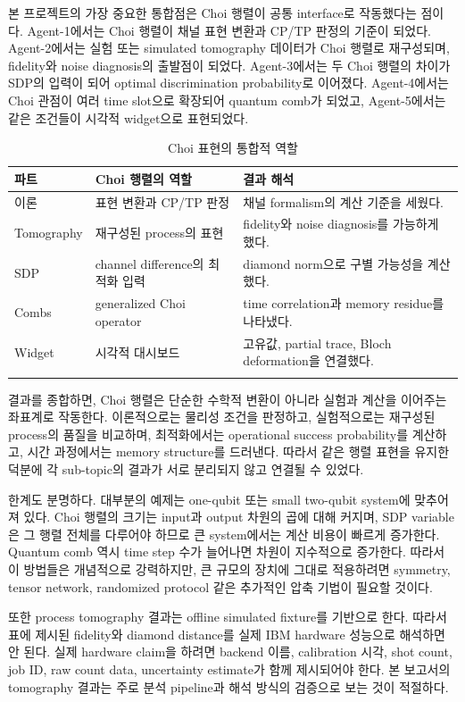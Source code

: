 \documentclass[11pt,a4paper]{article}
\begin{document}
본 프로젝트의 가장 중요한 통합점은 Choi 행렬이 공통 interface로 작동했다는 점이다. Agent-1에서는 Choi 행렬이 채널 표현 변환과 CP/TP 판정의 기준이 되었다. Agent-2에서는 실험 또는 simulated tomography 데이터가 Choi 행렬로 재구성되며, fidelity와 noise diagnosis의 출발점이 되었다. Agent-3에서는 두 Choi 행렬의 차이가 SDP의 입력이 되어 optimal discrimination probability로 이어졌다. Agent-4에서는 Choi 관점이 여러 time slot으로 확장되어 quantum comb가 되었고, Agent-5에서는 같은 조건들이 시각적 widget으로 표현되었다.

\begin{longtable}{p{}p{}p{}}
\toprule
파트 & Choi 행렬의 역할 & 결과 해석 \\
\midrule
이론 & 표현 변환과 CP/TP 판정 & 채널 formalism의 계산 기준을 세웠다. \\
Tomography & 재구성된 process의 표현 & fidelity와 noise diagnosis를 가능하게 했다. \\
SDP & channel difference의 최적화 입력 & diamond norm으로 구별 가능성을 계산했다. \\
Combs & generalized Choi operator & time correlation과 memory residue를 나타냈다. \\
Widget & 시각적 대시보드 & 고유값, partial trace, Bloch deformation을 연결했다. \\
\bottomrule
\caption{Choi 표현의 통합적 역할}
\label{tab:integration}
\end{longtable}

결과를 종합하면, Choi 행렬은 단순한 수학적 변환이 아니라 실험과 계산을 이어주는 좌표계로 작동한다. 이론적으로는 물리성 조건을 판정하고, 실험적으로는 재구성된 process의 품질을 비교하며, 최적화에서는 operational success probability를 계산하고, 시간 과정에서는 memory structure를 드러낸다. 따라서 같은 행렬 표현을 유지한 덕분에 각 sub-topic의 결과가 서로 분리되지 않고 연결될 수 있었다.

한계도 분명하다. 대부분의 예제는 one-qubit 또는 small two-qubit system에 맞추어져 있다. Choi 행렬의 크기는 input과 output 차원의 곱에 대해 커지며, SDP variable은 그 행렬 전체를 다루어야 하므로 큰 system에서는 계산 비용이 빠르게 증가한다. Quantum comb 역시 time step 수가 늘어나면 차원이 지수적으로 증가한다. 따라서 이 방법들은 개념적으로 강력하지만, 큰 규모의 장치에 그대로 적용하려면 symmetry, tensor network, randomized protocol 같은 추가적인 압축 기법이 필요할 것이다.

또한 process tomography 결과는 offline simulated fixture를 기반으로 한다. 따라서 표에 제시된 fidelity와 diamond distance를 실제 IBM hardware 성능으로 해석하면 안 된다. 실제 hardware claim을 하려면 backend 이름, calibration 시각, shot count, job ID, raw count data, uncertainty estimate가 함께 제시되어야 한다. 본 보고서의 tomography 결과는 주로 분석 pipeline과 해석 방식의 검증으로 보는 것이 적절하다.
\end{document}
